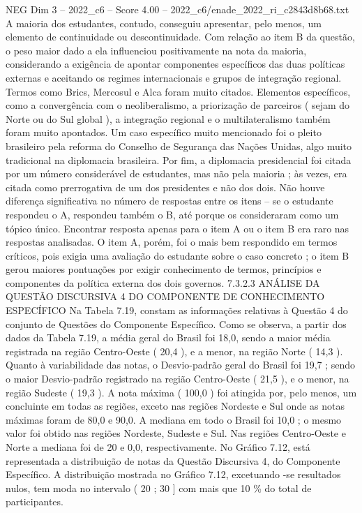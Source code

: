 \begin{textsample}{NEG Dim 3 – 2022\_c6 – Score 4.00 – 2022\_c6/enade\_2022\_ri\_c2843d8b68.txt}
A maioria dos estudantes, contudo, conseguiu apresentar, pelo menos, um elemento de continuidade ou descontinuidade.
Com relação ao item B da questão, o peso maior dado a ela influenciou positivamente na nota da maioria, considerando a exigência de apontar componentes específicos das duas políticas externas e aceitando os regimes internacionais e grupos de integração regional.
Termos como Brics, Mercosul e Alca foram muito citados.
Elementos específicos, como a convergência com o neoliberalismo, a priorização de parceiros ( sejam do Norte ou do Sul global ), a integração regional e o multilateralismo também foram muito apontados.
Um caso específico muito mencionado foi o pleito brasileiro pela reforma do Conselho de Segurança das Nações Unidas, algo muito tradicional na diplomacia brasileira.
Por fim, a diplomacia presidencial foi citada por um número considerável de estudantes, mas não pela maioria ; às vezes, era citada como prerrogativa de um dos presidentes e não dos dois.
Não houve diferença significativa no número de respostas entre os itens – se o estudante respondeu o A, respondeu também o B, até porque os consideraram como um tópico único.
Encontrar resposta apenas para o item A ou o item B era raro nas respostas analisadas.
O item A, porém, foi o mais bem respondido em termos críticos, pois exigia uma avaliação do estudante sobre o caso concreto ; o item B gerou maiores pontuações por exigir conhecimento de termos, princípios e componentes da política externa dos dois governos. 7.3.2.3 ANÁLISE DA QUESTÃO DISCURSIVA 4 DO COMPONENTE DE CONHECIMENTO ESPECÍFICO Na Tabela 7.19, constam as informações relativas à Questão 4 do conjunto de Questões do Componente Específico.
Como se observa, a partir dos dados da Tabela 7.19, a média geral do Brasil foi 18,0, sendo a maior média registrada na região Centro-Oeste ( 20,4 ), e a menor, na região Norte ( 14,3 ).
Quanto à variabilidade das notas, o Desvio-padrão geral do Brasil foi 19,7 ; sendo o maior Desvio-padrão registrado na região Centro-Oeste ( 21,5 ), e o menor, na região Sudeste ( 19,3 ).
A nota máxima ( 100,0 ) foi atingida por, pelo menos, um concluinte em todas as regiões, exceto nas regiões Nordeste e Sul onde as notas máximas foram de 80,0 e 90,0.
A mediana em todo o Brasil foi 10,0 ; o mesmo valor foi obtido nas regiões Nordeste, Sudeste e Sul.
Nas regiões Centro-Oeste e Norte a mediana foi de 20 e 0,0, respectivamente.
No Gráfico 7.12, está representada a distribuição de notas da Questão Discursiva 4, do Componente Específico.
A distribuição mostrada no Gráfico 7.12, excetuando -se resultados nulos, tem moda no intervalo ( 20 ; 30 ] com mais que 10 \% do total de participantes.

\end{textsample}
